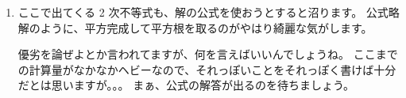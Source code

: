 \documentclass[./main.tex]{subfiles}
\begin{document}
\begin{enumerate}
        さて、次に $\mathrm{MSE} [T_n]$ が $\theta$ によらず一定となる条件を考えていくのですが、
        答案では断りなく $\theta, \theta^2$ の係数が $0$ となることが必要十分であるとしてしまっています。
        果たしてこれは大丈夫なのでしょうか？
        つまり、$\theta, \theta^2$ の係数が $0$ にならないケースでは、$\mathrm{MSE} [T_n]$ が $\theta$ に依存しないことはあり得ないと言い切れるでしょうか。
        結論から言うとこれは大丈夫なのですが、ちょっと不安に思った方は恒等式で係数比較して良い理由などを振り返っておきましょう。
        おそらく、必要性の証明は対偶を示すのが楽です。

        本題に戻ります。
        (係数) $= 0 $ として出てくる $\alpha_n, \beta_n$ の連立方程式は、無計画に解くと計算量がエラいことになります。
        実際なりました。
        色々やり方はあると思いますが、まず \eqref{eq:2024-suri-3-mse-a}, \eqref{eq:2024-suri-3-mse-b} ともに
        $(n \alpha_n - 1)$ と $n {\alpha_n}^2$ の塊があることに気付きます。
        次に、\eqref{eq:2024-suri-3-mse-a} の方は $\alpha_n$ だけの式になっていますが、よく見ると (ほぼ) 完全平方式になっているので、
        両辺の平方根をとれば $\alpha_n$ がすぐ求まると気付きます。
        $\beta_n$ を求める際も、\eqref{eq:2024-suri-3-mse-a} と \eqref{eq:2024-suri-3-mse-b} を辺々割るなり代入するなりすれば
        計算がかなり減ります。
        ただ、$n \alpha_n - 1$ が $0$ にならないことや、不用意に $\pm$ と $\mp$ をひっくり返してはいけないことなど、
        節々に注意点が点在するのでそこは気を付けましょう。

        \item ここで出てくる 2 次不等式も、解の公式を使おうとすると沼ります。
        公式略解のように、平方完成して平方根を取るのがやはり綺麗な気がします。

        優劣を論ぜよとか言われてますが、何を言えばいいんでしょうね。
        ここまでの計算量がなかなかヘビーなので、それっぽいことをそれっぽく書けば十分だとは思いますが。。。
        まぁ、公式の解答が出るのを待ちましょう。
        
    \end{enumerate}
\end{document}
